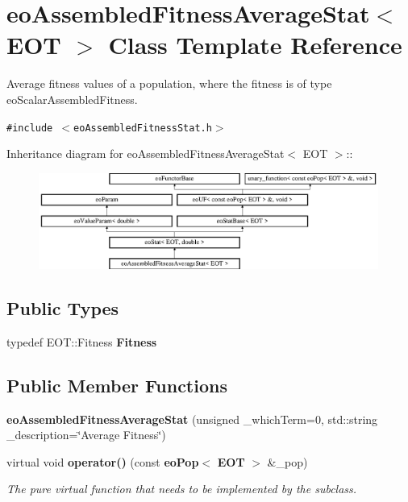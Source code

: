 \section{eo\-Assembled\-Fitness\-Average\-Stat$<$ EOT $>$ Class Template Reference}
\label{classeo_assembled_fitness_average_stat}
Average fitness values of a population, where the fitness is of type eo\-Scalar\-Assembled\-Fitness.  


{\tt \#include $<$eo\-Assembled\-Fitness\-Stat.h$>$}

Inheritance diagram for eo\-Assembled\-Fitness\-Average\-Stat$<$ EOT $>$::\begin{figure}[H]
\begin{center}
\leavevmode
\includegraphics[height=3.15315cm]{classeo_assembled_fitness_average_stat}
\end{center}
\end{figure}
\subsection*{Public Types}
\begin{CompactItemize}
\item 
typedef EOT::Fitness {\bf Fitness}\label{classeo_assembled_fitness_average_stat_w0}

\end{CompactItemize}
\subsection*{Public Member Functions}
\begin{CompactItemize}
\item 
{\bf eo\-Assembled\-Fitness\-Average\-Stat} (unsigned \_\-which\-Term=0, std::string \_\-description=\char`\"{}Average Fitness\char`\"{})\label{classeo_assembled_fitness_average_stat_a0}

\item 
virtual void {\bf operator()} (const {\bf eo\-Pop}$<$ {\bf EOT} $>$ \&\_\-pop)\label{classeo_assembled_fitness_average_stat_a1}

\begin{CompactList}\small\item\em The pure virtual function that needs to be implemented by the subclass. \item\end{CompactList}\end{CompactItemize}
